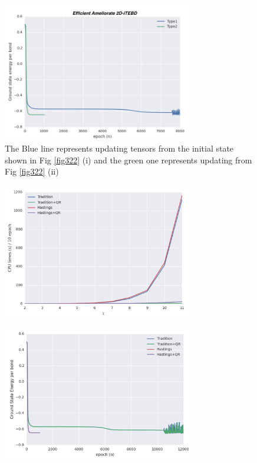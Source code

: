\begin{figure}[ht]
	\centering
	\includegraphics[width=0.75\textwidth]{figures/fig323.png}
	\caption[Comparison the results of Heisenberg model on square lattice which are obtaining from different initial states.]{The Blue line represents updating tensors from the initial state shown in Fig \ref{fig322} (i) and the green one represents updating from Fig \ref{fig322} (ii)}
	\label{fig323}
\end{figure}

\begin{figure}[ht]
	\centering
	\includegraphics[width=0.75\textwidth]{figures/fig324.png}
	\caption[CPU times of different 2D-iTEBD with fixed trucation error]{}
	\label{fig324}
\end{figure}

\begin{figure}[ht]
	\centering
	\includegraphics[width=0.75\textwidth]{figures/fig325.png}
	\caption[Per epoch energy of Heisenberg model on 2d square lattice with fixed truncation error]{}
	\label{fig325}
\end{figure}

